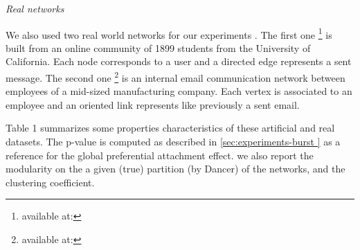 \textit{Real networks}

We also used two real world networks for our experiments .
The first one \footnote{available at:} is built from an online community of 1899 students from the University of California. Each node corresponds to a user and a    directed edge represents a sent message.
The second one \footnote{available at:} is an internal email communication network between employees of a mid-sized manufacturing company. Each vertex is associated  to an employee and an oriented link represents like previously a sent email.

Table 1 summarizes some properties characteristics of these artificial and real datasets. The  p-value is computed as described in \ref{sec:experiments-burst } as a reference for the global preferential attachment effect. we also report the modularity on the a given (true) partition (by Dancer) of the networks, and the clustering coefficient.

